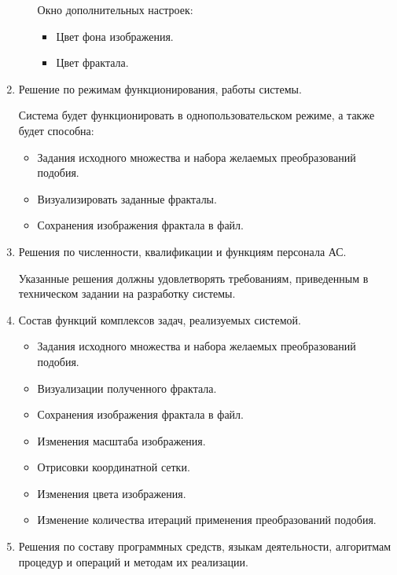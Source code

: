 \documentclass[a4paper,12pt,preview]{report} %
\begin{document}
\begin{enumerate}
\begin{enumerate}
			Окно дополнительных настроек:
				
				\begin{itemize}
					\item Цвет фона изображения.
					\item Цвет фрактала.
				\end{itemize}
				
			
			
			
		\end{enumerate}
		
		\item Решение по режимам функционирования, работы системы.
		
		 Система будет функционировать в однопользовательском режиме, а также будет способна:
		
		\begin{itemize}
			\item Задания исходного множества и набора желаемых преобразований подобия.
			\item Визуализировать заданные фракталы.
			\item Сохранения изображения фрактала в файл.
		\end{itemize}
		
		\item Решения по численности, квалификации и функциям персонала АС.
		
		Указанные решения должны удовлетворять требованиям, приведенным в техническом задании на разработку системы.
		
		\item Состав функций комплексов задач, реализуемых системой.
		
		
		\begin{itemize}
			\item Задания исходного множества и набора желаемых преобразований подобия.
			\item Визуализации полученного фрактала.
			\item Сохранения изображения фрактала в файл.
			\item Изменения масштаба изображения.
			\item Отрисовки координатной сетки.
			\item Изменения цвета изображения.
			\item Изменение количества итераций применения преобразований подобия.
		\end{itemize}
	
		\item Решения по составу программных средств, языкам деятельности, алгоритмам процедур и операций и методам их реализации.
		

\end{enumerate}
\end{document}
